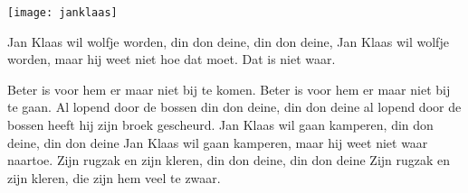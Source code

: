 \begin{intersong}
    \texttt{[image: janklaas]}
\end{intersong}
\beginverse
Jan Klaas wil wolfje worden,
din don deine, din don deine,
Jan Klaas wil wolfje worden,
maar hij weet niet hoe dat moet.
\endverse
\beginchorus
Dat is niet waar.

Beter is voor hem 
er maar niet bij te komen.
Beter is voor hem 
er maar niet bij te gaan.
\endchorus
\beginverse
Al lopend door de bossen
din don deine, din don deine
al lopend door de bossen
heeft hij zijn broek gescheurd.
\endverse
\beginverse
Jan Klaas wil gaan kamperen,
din don deine, din don deine
Jan Klaas wil gaan kamperen,
maar hij weet niet waar naartoe.
\endverse
\beginverse
Zijn rugzak en zijn kleren,
din don deine, din don deine
Zijn rugzak en zijn kleren,
die zijn hem veel te zwaar.
\endverse
\endsong